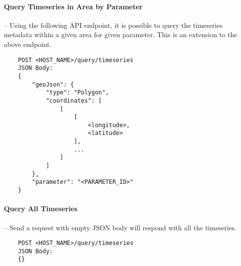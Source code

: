 \paragraph{Query Timeseries in Area by Parameter}-- Using the following API endpoint, it is possible to query the timeseries metadata within a given area for given parameter. This is an extension to the above endpoint.
\begin{lstlisting}
    POST <HOST_NAME>/query/timeseries
    JSON Body:
    {
        "geoJson": {
            "type": "Polygon",
            "coordinates": [
                [
                    [
                        <longitude>,
                        <latitude>
                    ],
                    ...
                ]
            ]
        },
        "parameter": "<PARAMETER_ID>"
    }
\end{lstlisting}

\paragraph{Query All Timeseries} -- Send a request with empty JSON body will respond with all the timeseries.
\begin{lstlisting}
    POST <HOST_NAME>/query/timeseries
    JSON Body:
    {}
\end{lstlisting}

